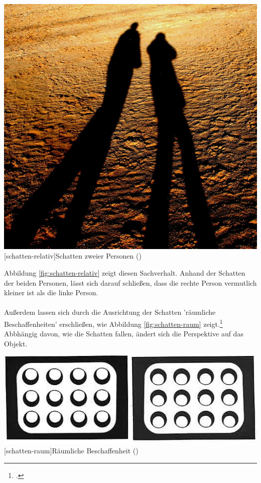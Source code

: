 \vspace{1em}
\begin{minipage}{\linewidth}
	\centering
	\includegraphics[width=0.7\linewidth]{images/schatten_personen.jpg}
	[schatten-relativ]{Schatten zweier Personen (\cite{PixaXX})}
	\label{fig:schatten-relativ}
\end{minipage}
\vspace{1em} 

Abbildung \ref{fig:schatten-relativ} zeigt diesen Sachverhalt. Anhand der Schatten der beiden Personen, lässt sich darauf schließen, dass die rechte Person vermutlich kleiner ist als die linke Person.\\
\\
Außerdem lassen sich durch die Ausrichtung der Schatten  'räumliche Beschaffenheiten' erschließen, wie Abbildung \ref{fig:schatten-raum} zeigt.\footcite[Vgl.]{heidXX} Abbhängig davon, wie die Schatten fallen, ändert sich die Perspektive auf das Objekt.

\vspace{1em}
\begin{minipage}{\linewidth}
	\centering
	\includegraphics[width=0.7\linewidth]{images/schatten01.jpg}
	[schatten-raum]{Räumliche Beschaffenheit (\cite{heidXX})}
	\label{fig:schatten-raum}
\end{minipage}
\vspace{1em}

